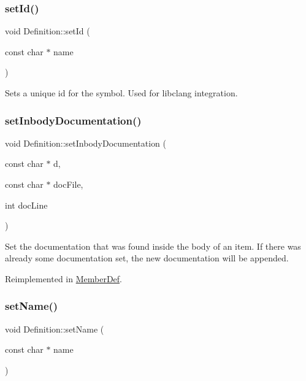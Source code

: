 \mbox{\label{class_definition_ae653664eee43cfe5992cd91377f8e91b}} 
\subsubsection{\texorpdfstring{setId()}{setId()}}
{\footnotesize\ttfamily void Definition\+::set\+Id (\begin{DoxyParamCaption}\item[{const char $\ast$}]{name }\end{DoxyParamCaption})}

Sets a unique id for the symbol. Used for libclang integration. \mbox{\label{class_definition_a829959b92985d0264b9fc17277bf91b4}} 
\subsubsection{\texorpdfstring{setInbodyDocumentation()}{setInbodyDocumentation()}}
{\footnotesize\ttfamily void Definition\+::set\+Inbody\+Documentation (\begin{DoxyParamCaption}\item[{const char $\ast$}]{d,  }\item[{const char $\ast$}]{doc\+File,  }\item[{int}]{doc\+Line }\end{DoxyParamCaption})\hspace{0.3cm}{\ttfamily [virtual]}}

Set the documentation that was found inside the body of an item. If there was already some documentation set, the new documentation will be appended. 

Reimplemented in \mbox{\hyperlink{class_member_def_a6c64c400180a47b04ad9a1d18a535184}{Member\+Def}}.

\mbox{\label{class_definition_aaa3c1632bd89cb3db7c7713df4e36db0}} 
\subsubsection{\texorpdfstring{setName()}{setName()}}
{\footnotesize\ttfamily void Definition\+::set\+Name (\begin{DoxyParamCaption}\item[{const char $\ast$}]{name }\end{DoxyParamCaption})\hspace{0.3cm}{\ttfamily [virtual]}}

